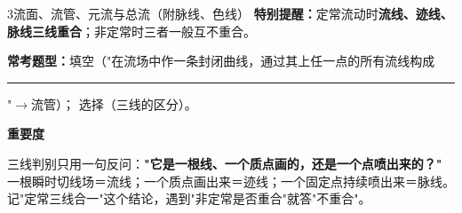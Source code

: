 \begin{kaodian}{3}{流面、流管、元流与总流（附脉线、色线）}
\textbf{特别提醒：}定常流动时\textbf{流线、迹线、脉线三线重合}；非定常时三者一般互不重合。

\textbf{常考题型：}填空（"在流场中作一条封闭曲线，通过其上任一点的所有流线构成\rule{3cm}{0.4pt}"$\to$流管）；
选择（三线的区分）。

\textbf{重要度 }\quad{}\quad{}

\begin{banfa}
三线判别只用一句反问：\textbf{"它是一根线、一个质点画的，还是一个点喷出来的？"}
一根瞬时切线场＝流线；一个质点画出来＝迹线；一个固定点持续喷出来＝脉线。
记"定常三线合一"这个结论，遇到"非定常是否重合"就答"不重合"。
\end{banfa}
\end{kaodian}

